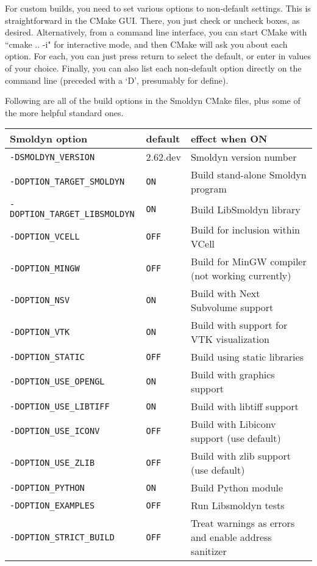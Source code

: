 \documentclass {scrbook}
\newcommand {\ttt} {\texttt}
\begin{document}
For custom builds, you need to set various options to non-default settings. This is straightforward in the CMake GUI. There, you just check or uncheck boxes, as desired. Alternatively, from a command line interface, you can start CMake with ``cmake .. -i" for interactive mode, and then CMake will ask you about each option. For each, you can just press return to select the default, or enter in values of your choice. Finally, you can also list each non-default option directly on the command line (preceded with a `D', presumably for define).

Following are all of the build options in the Smoldyn CMake files, plus some of the more helpful standard ones.

\begin{longtable}[c]{lll}
Smoldyn option & default & effect when ON\\
\hline
\ttt{-DSMOLDYN\_VERSION} & 2.62.dev & Smoldyn version number\\
\ttt{-DOPTION\_TARGET\_SMOLDYN} & \ttt{ON} & Build stand-alone Smoldyn program\\
\ttt{-DOPTION\_TARGET\_LIBSMOLDYN} & \ttt{ON} & Build LibSmoldyn library\\
\ttt{-DOPTION\_VCELL} & \ttt{OFF} & Build for inclusion within VCell\\
\ttt{-DOPTION\_MINGW} & \ttt{OFF} & Build for MinGW compiler (not working currently)\\
\ttt{-DOPTION\_NSV} & \ttt{ON} & Build with Next Subvolume support\\
\ttt{-DOPTION\_VTK} & \ttt{ON} & Build with support for VTK visualization\\
\ttt{-DOPTION\_STATIC} & \ttt{OFF} & Build using static libraries\\
\ttt{-DOPTION\_USE\_OPENGL} & \ttt{ON} & Build with graphics support\\
\ttt{-DOPTION\_USE\_LIBTIFF} & \ttt{ON} & Build with libtiff support\\
\ttt{-DOPTION\_USE\_ICONV} & \ttt{OFF} & Build with Libiconv support (use default)\\
\ttt{-DOPTION\_USE\_ZLIB} & \ttt{OFF} & Build with zlib support (use default)\\
\ttt{-DOPTION\_PYTHON} & \ttt{ON} & Build Python module\\
\ttt{-DOPTION\_EXAMPLES} & \ttt{OFF} & Run Libsmoldyn tests\\
\ttt{-DOPTION\_STRICT\_BUILD} & \ttt{OFF} & Treat warnings as errors and enable address sanitizer\\

\end{longtable}
\end{document}
